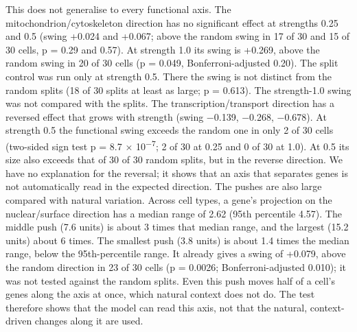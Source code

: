 \documentclass[
  11pt,
]{article}
\begin{document}
This does not generalise to every functional axis. The
mitochondrion/cytoskeleton direction has no significant effect at
strengths 0.25 and 0.5 (swing +0.024 and +0.067; above the random swing
in 17 of 30 and 15 of 30 cells, p = 0.29 and 0.57). At strength 1.0 its
swing is +0.269, above the random swing in 20 of 30 cells (p = 0.049,
Bonferroni-adjusted 0.20). The split control was run only at strength
0.5. There the swing is not distinct from the random splits (18 of 30
splits at least as large; p = 0.613). The strength-1.0 swing was not
compared with the splits. The transcription/transport direction has a
reversed effect that grows with strength (swing −0.139, −0.268, −0.678).
At strength 0.5 the functional swing exceeds the random one in only 2 of
30 cells (two-sided sign test p = 8.7 × 10\textsuperscript{−7}; 2 of 30
at 0.25 and 0 of 30 at 1.0). At 0.5 its size also exceeds that of 30 of
30 random splits, but in the reverse direction. We have no explanation
for the reversal; it shows that an axis that separates genes is not
automatically read in the expected direction. The pushes are also large
compared with natural variation. Across cell types, a gene's projection
on the nuclear/surface direction has a median range of 2.62 (95th
percentile 4.57). The middle push (7.6 units) is about 3 times that
median range, and the largest (15.2 units) about 6 times. The smallest
push (3.8 units) is about 1.4 times the median range, below the
95th-percentile range. It already gives a swing of +0.079, above the
random direction in 23 of 30 cells (p = 0.0026; Bonferroni-adjusted
0.010); it was not tested against the random splits. Even this push
moves half of a cell's genes along the axis at once, which natural
context does not do. The test therefore shows that the model can read
this axis, not that the natural, context-driven changes along it are
used.
\end{document}
